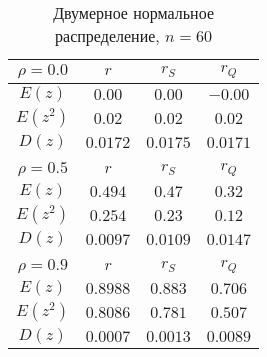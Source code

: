 \documentclass[12pt,a4paper]{article}
\begin{document}
\begin{center}
		\begin{table}[H]
			\begin{center}
				\begin{tabular}{|c|c|c|c|}
					\hline
					$\rho=0.0$ & $r$ & $r_S$ & $r_Q$\\
					\hline
					$E(z)$ & $0.00$ & $0.00$ & $-0.00$\\
					\hline
					$E(z^2)$ & $0.02$ & $0.02$ & $0.02$\\
					\hline
					$D(z)$ & $0.0172$ & $0.0175$ & $0.0171$\\
					\hline
					\multicolumn{4}{c}{ } \\
					\hline
					$\rho=0.5$ & $r$ & $r_S$ & $r_Q$\\
					\hline
					$E(z)$ & $0.494$ & $0.47$ & $0.32$\\
					\hline
					$E(z^2)$ & $0.254$ & $0.23$ & $0.12$\\
					\hline
					$D(z)$ & $0.0097$ & $0.0109$ & $0.0147$\\
					\hline
					\multicolumn{4}{c}{ } \\
					\hline
					$\rho=0.9$ & $r$ & $r_S$ & $r_Q$\\
					\hline
					$E(z)$ & $0.8988$ & $0.883$ & $0.706$\\
					\hline
					$E(z^2)$ & $0.8086$ & $0.781$ & $0.507$\\
					\hline
					$D(z)$ & $0.0007$ & $0.0013$ & $0.0089$\\
					\hline					
				\end{tabular}
				\caption{Двумерное нормальное распределение, $n = 60$}
			\end{center}
		\end{table}
		

\end{center}
\end{document}
